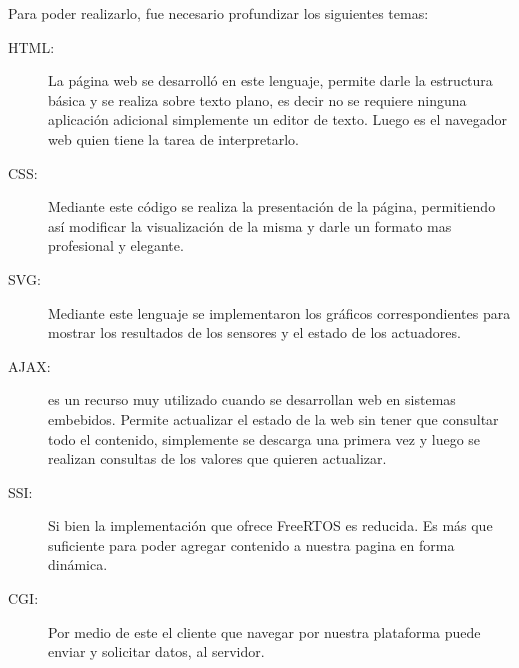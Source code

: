 Para poder realizarlo, fue necesario profundizar los siguientes temas:
\begin{description}
  \item[HTML:] La página web se desarrolló en este lenguaje, permite darle la estructura básica y se realiza sobre texto plano, es decir no se requiere ninguna aplicación adicional simplemente un editor de texto. Luego es el navegador web quien tiene la tarea de interpretarlo. 
  \item[CSS:] Mediante este código se realiza la presentación de la página, permitiendo así modificar la visualización de la misma y darle un formato mas profesional y elegante.
  \item[SVG:] Mediante este lenguaje se implementaron los gráficos correspondientes para mostrar los resultados de los sensores y el estado de los actuadores.
  \item[AJAX:] es un recurso muy utilizado cuando se desarrollan web en sistemas embebidos. Permite actualizar el estado de la web sin tener que consultar todo el contenido, simplemente se descarga una primera vez y luego se realizan consultas de los valores que quieren actualizar. 
  \item[SSI:] Si bien la implementación que ofrece FreeRTOS es reducida. Es más que suficiente para poder agregar contenido a nuestra pagina en forma dinámica.
  \item[CGI:] Por medio de este el cliente que navegar por nuestra plataforma puede enviar y solicitar datos, al servidor.
\end{description}

